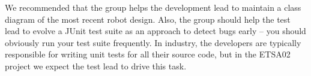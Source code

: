 \documentclass{scrreprt}
\begin{document}
We recommended that the group helps the development lead to maintain a class diagram of the most recent robot design. Also, the group should help the test lead to evolve a JUnit test suite as an approach to detect bugs early -- you should obviously run your test suite frequently. In industry, the developers are typically responsible for writing unit tests for all their source code, but in the ETSA02 project we expect the test lead to drive this task. 
\end{document}
